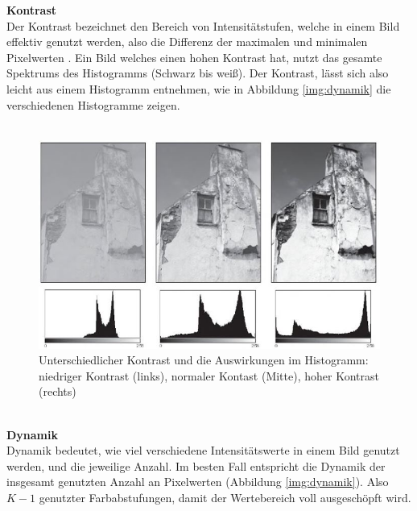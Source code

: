\documentclass[a4paper,12pt,oneside]{article}
\begin{document}
\textbf{Kontrast}\label{s.kontrast}\\
Der Kontrast bezeichnet den Bereich von Intensitätstufen, welche in einem Bild effektiv genutzt werden, also die Differenz der maximalen und minimalen Pixelwerten \cite[44]{burger2009digitale}. Ein Bild welches einen hohen Kontrast hat, nutzt das gesamte Spektrums des Histogramms (Schwarz bis weiß). Der Kontrast, lässt sich also leicht aus einem Histogramm entnehmen, wie in Abbildung \ref{img:dynamik} die verschiedenen Histogramme zeigen.\\\\
  \begin{figure}
    [h]
    \centering
    \includegraphics[scale=0.7]{Sources/kontrast.JPG}
    \caption{Unterschiedlicher Kontrast und die Auswirkungen im Histogramm: niedriger Kontrast (links), normaler Kontast (Mitte), hoher Kontrast (rechts)\cite[45]{burger2009digitale}}
    \label{img:kontrast}
  \end{figure}\\
\textbf{Dynamik}\label{s.dynamik}\\
Dynamik bedeutet, wie viel verschiedene Intensitätswerte in einem Bild genutzt werden, und die jeweilige Anzahl\cite[44]{burger2009digitale}. Im besten Fall entspricht die Dynamik der insgesamt genutzten Anzahl an Pixelwerten (Abbildung \ref{img:dynamik}). Also $K-1$ genutzter Farbabstufungen, damit der Wertebereich voll ausgeschöpft wird.\\
\end{document}
